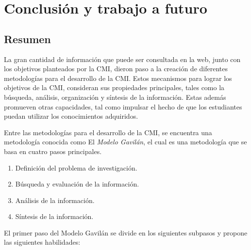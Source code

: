 
\chapter{Conclusión y trabajo a futuro}
\label{capV}



\section{Resumen}
\label{ResumencapV}

La gran cantidad de información que puede ser consultada en la web, junto con los objetivos planteados por la CMI, dieron paso a la creación de diferentes metodologías para el desarrollo de la CMI. Estos mecanismos para lograr los objetivos de la CMI, consideran sus propiedades principales, tales como la búsqueda, análisis, organización y síntesis de la información. Estas además promueven otras capacidades, tal como impulsar el hecho de que los estudiantes puedan utilizar los conocimientos adquiridos.

Entre las metodologías para el desarrollo de la CMI, se encuentra una metodología conocida como El \textit{Modelo Gavilán}, el cual es una metodología que se basa en cuatro pasos principales.

\begin{enumerate}
  \item Definición del problema de investigación.
  \item Búsqueda y evaluación de la información.
  \item Análisis de la información.
  \item Síntesis de la información.
\end{enumerate}

El primer paso del Modelo Gavilán se divide en los siguientes subpasos y propone las siguientes habilidades:

